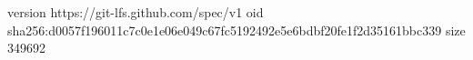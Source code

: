 version https://git-lfs.github.com/spec/v1
oid sha256:d0057f196011c7c0e1e06e049c67fc5192492e5e6bdbf20fe1f2d35161bbc339
size 349692
